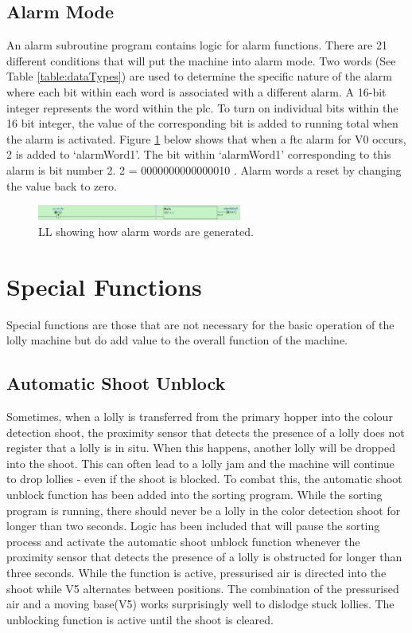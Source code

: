     \subsection{Alarm Mode}
        An alarm subroutine program contains logic for alarm functions. There are 21 different conditions that will put the machine into alarm mode. Two words (See Table \ref{table:dataTypes}) are used to determine the specific nature of the alarm where each bit within each word is associated with a different alarm. A 16-bit integer represents the word within the \acrshort{plc}. To turn on individual bits within the 16 bit integer, the value of the corresponding bit is added to running total when the alarm is activated. Figure \ref{fig:alarmWord} below shows that when a \acrshort{ftc} alarm for V0 occurs, 2 is added to `alarmWord1'. The bit within `alarmWord1' corresponding to this alarm is bit number 2. 2 = 0000000000000010 .
        Alarm words a reset by changing the value back to zero. 

        \begin{figure}[H]
            \centering
            \includegraphics[width = 0.6\textwidth]{2_images/alarmWord}
            \caption{LL showing how alarm words are generated.}
            \label{fig:alarmWord}
        \end{figure}

\section{Special Functions}
    Special functions are those that are not necessary for the basic operation of the lolly machine but do add value to the overall function of the machine.

    \subsection{Automatic Shoot Unblock}
        Sometimes, when a lolly is transferred from the primary hopper into the colour detection shoot, the proximity sensor that detects the presence of a lolly does not register that a lolly is in situ. When this happens, another lolly will be dropped into the shoot. This can often lead to a lolly jam and the machine will continue to drop lollies - even if the shoot is blocked. To combat this, the automatic shoot unblock function has been added into the sorting program. While the sorting program is running, there should never be a lolly in the color detection shoot for longer than two seconds. Logic has been included that will pause the sorting process and activate the automatic shoot unblock function whenever the proximity sensor that detects the presence of a lolly is obstructed for longer than three seconds. While the function is active, pressurised air is directed into the shoot while V5 alternates between positions. The combination of the pressurised air and a moving base(V5) works surprisingly well to dislodge stuck lollies. The unblocking function is active until the shoot is cleared. 
        
